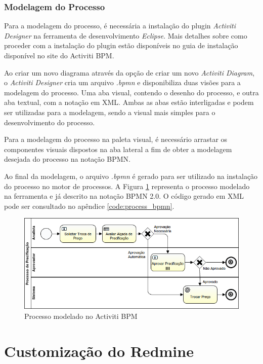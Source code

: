 \subsubsection{Modelagem do Processo}\label{sec:automatizacao_processos-modelagem_processo}

Para a modelagem do processo, é necessária a instalação do plugin \textit{Activiti Designer} na ferramenta de desenvolvimento \textit{Eclipse}\cite{eclipse}. Mais detalhes sobre como proceder com a instalação do plugin estão disponíveis no guia de instalação disponível no site\cite{activiti_designer} do Activiti BPM.

Ao criar um novo diagrama através da opção de criar um novo \textit{Activiti Diagram}, o \textit{Activiti Designer} cria um arquivo \textit{.bpmn} e disponibiliza duas visões para a modelagem do processo. Uma aba visual, contendo o desenho do processo, e outra aba textual, com a notação em XML. Ambas as abas estão interligadas e podem ser utilizadas para a modelagem, sendo a visual mais simples para o desenvolvimento do processo.

Para a modelagem do processo na paleta visual, é necessário arrastar os componentes visuais dispostos na aba lateral a fim de obter a modelagem desejada do processo na notação BPMN.

Ao final da modelagem, o arquivo \textit{.bpmn} é gerado para ser utilizado na instalação do processo no motor de processos. A Figura \ref{fig:processo_precificacao} representa o processo modelado na ferramenta e já descrito na notação BPMN 2.0. O código gerado em XML pode ser consultado no apêndice \ref{code:process_bpmn}.

\begin{figure}[H]
\centering
\includegraphics[width=1.0\textwidth]{imagens/ProcessoDePrecificacao}
\caption{Processo modelado no Activiti BPM}
\label{fig:processo_precificacao}
\end{figure}

\section{Customização do Redmine}\label{sec:integracao_redmine_activiti-implementacao}

